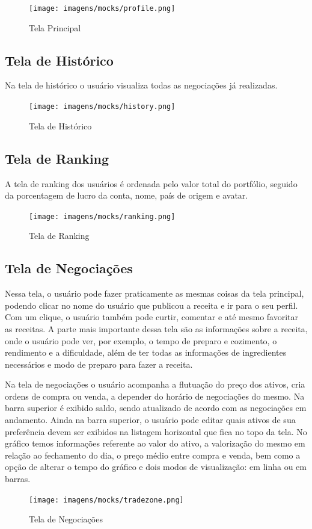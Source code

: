 \begin{figure}[H]
  \caption{\label{fig:mock_login}Tela Principal}
  \centering
  \texttt{[image: imagens/mocks/profile.png]}
\end{figure}

\subsection{Tela de Histórico}
Na tela de histórico o usuário visualiza todas as negociações já realizadas.

\begin{figure}[H]
  \caption{\label{fig:mock_login}Tela de Histórico}
  \centering
  \texttt{[image: imagens/mocks/history.png]}
\end{figure}

\subsection{Tela de Ranking}
A tela de ranking dos usuários é ordenada pelo valor total do portfólio, seguido da porcentagem de lucro da conta, nome, país de origem e avatar.

\begin{figure}[H]
  \caption{\label{fig:mock_login}Tela de Ranking}
  \centering
  \texttt{[image: imagens/mocks/ranking.png]}
\end{figure}

\subsection{Tela de Negociações}
Nessa tela, o usuário pode fazer praticamente as mesmas coisas da tela principal, podendo clicar no nome do usuário que publicou a receita e ir para o seu perfil. Com um clique, o usuário também pode curtir, comentar e até mesmo favoritar as receitas. A parte mais importante dessa tela são as informações sobre a receita, onde o usuário pode ver, por exemplo, o tempo de preparo e cozimento, o rendimento e a dificuldade, além de ter todas as informações de ingredientes necessários e modo de preparo para fazer a receita.

Na tela de negociações o usuário acompanha a flutuação do preço dos ativos, cria ordens de compra ou venda, a depender do horário de negociações do mesmo. Na barra superior é exibido saldo, sendo atualizado de acordo com as negociações em andamento. Ainda na barra superior, o usuário pode editar quais ativos de sua preferência devem ser exibidos na listagem horizontal que fica no topo da tela.
No gráfico temos informações referente ao valor do ativo, a valorização do mesmo em relação ao fechamento do dia, o preço médio entre compra e venda, bem como a opção de alterar o tempo do gráfico e dois modos de visualização: em linha ou em barras.

\begin{figure}[H]
  \caption{\label{fig:mock_login}Tela de Negociações}
  \centering
  \texttt{[image: imagens/mocks/tradezone.png]}
\end{figure}